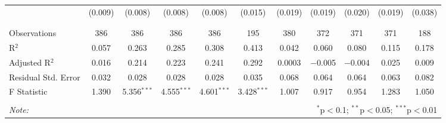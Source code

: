 \begin{table}[H]
\begin{tabular}{@{\extracolsep{4pt}}lcccccccccc}
  & (0.009) & (0.008) & (0.008) & (0.008) & (0.015) & (0.019) & (0.019) & (0.020) & (0.019) & (0.038) \\ 
  & & & & & & & & & & \\ 
\hline \\[-1.8ex] 
Observations & 386 & 386 & 386 & 386 & 195 & 380 & 372 & 371 & 371 & 188 \\ 
R$^{2}$ & 0.057 & 0.263 & 0.285 & 0.308 & 0.413 & 0.042 & 0.060 & 0.080 & 0.115 & 0.178 \\ 
Adjusted R$^{2}$ & 0.016 & 0.214 & 0.223 & 0.241 & 0.292 & 0.0003 & $-$0.005 & $-$0.004 & 0.025 & 0.009 \\ 
Residual Std. Error & 0.032 & 0.028 & 0.028 & 0.028 & 0.035 & 0.068 & 0.064 & 0.064 & 0.063 & 0.082 \\ 
F Statistic & 1.390 & 5.356$^{***}$ & 4.555$^{***}$ & 4.601$^{***}$ & 3.428$^{***}$ & 1.007 & 0.917 & 0.954 & 1.283 & 1.050 \\ 
\hline 
\hline \\[-1.8ex] 
\textit{Note:}  & \multicolumn{10}{r}{$^{*}$p$<$0.1; $^{**}$p$<$0.05; $^{***}$p$<$0.01} \\ 
\end{tabular} 
\end{table} 
